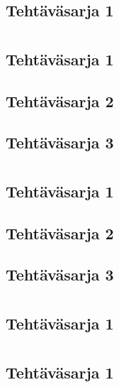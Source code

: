 \chapter{}
	\section{Tehtäväsarja 1}
		
\chapter{}
	\section{Tehtäväsarja 1}
		
	\section{Tehtäväsarja 2}
		
	\section{Tehtäväsarja 3}
		
\chapter{}
	\section{Tehtäväsarja 1}
		
	\section{Tehtäväsarja 2}
		
	\section{Tehtäväsarja 3}
		
\chapter{}
	\section{Tehtäväsarja 1}
		
\chapter{}
	\section{Tehtäväsarja 1}
		

